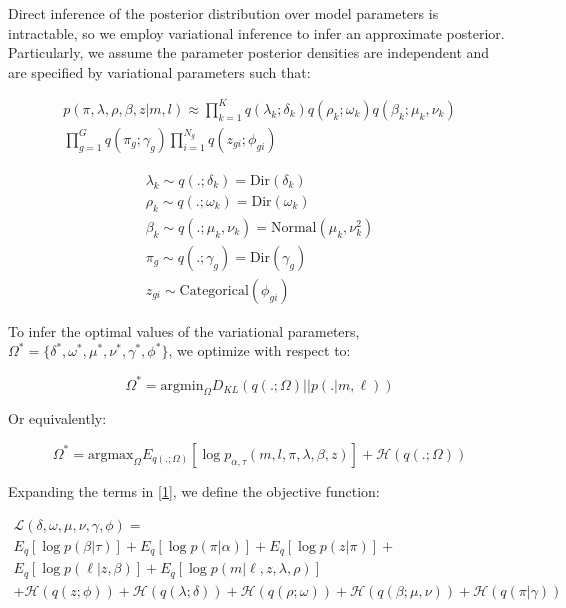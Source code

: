 \documentclass{article}
\newcommand{\Lagr}{\mathcal{L}}
\begin{document}
Direct inference of the posterior distribution over model parameters is intractable, so we employ variational inference to infer an approximate posterior. Particularly,
we assume the parameter posterior densities are independent and are specified by variational parameters such that:

\begin{align}
p(\pi,\lambda,\rho,\beta,z | m, l) \approx \prod_{k=1}^K q(\lambda_k; \delta_k)q(\rho_k; \omega_k)q(\beta_k; \mu_k, \nu_k) \\
	\prod_{g=1}^G q(\pi_g; \gamma_g) \prod_{i=1}^{N_g} q(z_{gi};\phi_{gi})
\end{align}

\begin{align*}
\lambda_k \sim q(.;\delta_k) = \textrm{Dir}(\delta_k) \\
	\rho_k \sim q(.;\omega_k) = \textrm{Dir}(\omega_k) \\
	\beta_k \sim q(.;\mu_k, \nu_k) = \textrm{Normal}(\mu_k, \nu_k^2) \\
	\pi_g \sim q(.;\gamma_g) = \textrm{Dir}(\gamma_g) \\
	z_{gi} \sim \textrm{Categorical}(\phi_{gi})
\end{align*}

To infer the optimal values of the variational parameters, $\Omega^* = \{\delta^*, \omega^*, \mu^*, \nu^*, \gamma^*, \phi^*\}$, we optimize with respect to:

\begin{equation}
\Omega^* = \mathrm{argmin}_{\Omega} D_{KL}( q(.;\Omega) || p(.| m, \ell) )
\end{equation}

Or equivalently:

\begin{equation} \label{1}
\Omega^* = \mathrm{argmax}_{\Omega} E_{q(.;\Omega)}[\log p_{\alpha,\tau}(m,l, \pi, \lambda, \beta, z)] + \mathcal{H}(q(.;\Omega))
\end{equation}

Expanding the terms in \eqref{1}, we define the objective function:

\begin{equation} \label{L}
\begin{split}
\Lagr(\delta, \omega, \mu, \nu, \gamma, \phi) = \\
	E_q [\log p(\beta | \tau)] + E_q [\log{p(\pi | \alpha)}] +  E_q [\log{p(z | \pi )}] + \\
	E_q [\log{p(\ell | z, \beta)}] + E_q [\log{p(m | \ell, z, \lambda, \rho)}] \\
	+ \mathcal{H}(q(z;\phi)) + \mathcal{H}(q(\lambda;\delta)) + \mathcal{H}(q(\rho;\omega)) + \mathcal{H}(q(\beta;\mu, \nu)) + \mathcal{H}(q(\pi|\gamma)) 
\end{split}
\end{equation}
\end{document}
